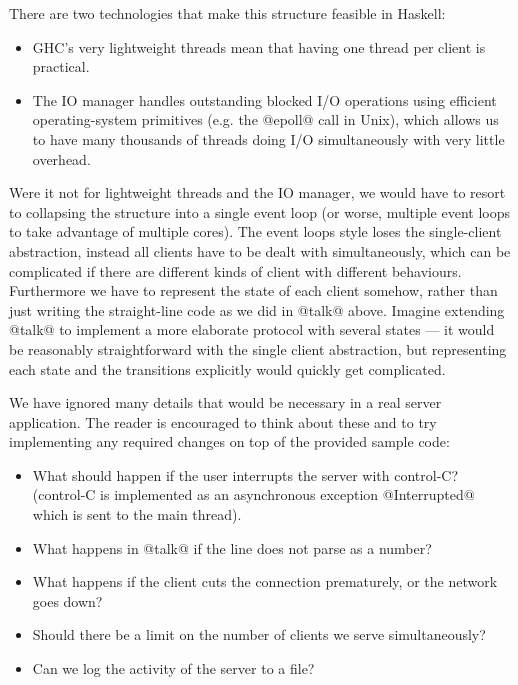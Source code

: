 There are two technologies that make this structure feasible in
Haskell:

\begin{itemize}
\item GHC's very lightweight threads mean that having one thread per
  client is practical.
\item The IO manager \cite{io-manager} handles outstanding blocked I/O
  operations using efficient operating-system primitives (e.g. the
  @epoll@ call in Unix), which allows us to have many thousands of
  threads doing I/O simultaneously with very little overhead.
\end{itemize}

Were it not for lightweight threads and the IO manager, we would have
to resort to collapsing the structure into a single event loop (or
worse, multiple event loops to take advantage of multiple cores).  The
event loops style loses the single-client abstraction, instead all
clients have to be dealt with simultaneously, which can be complicated
if there are different kinds of client with different behaviours.
Furthermore we have to represent the state of each client somehow,
rather than just writing the straight-line code as we did in @talk@
above.  Imagine extending @talk@ to implement a more elaborate
protocol with several states --- it would be reasonably
straightforward with the single client abstraction, but representing
each state and the transitions explicitly would quickly get
complicated.

We have ignored many details that would be necessary in a real server
application.  The reader is encouraged to think about these and to try
implementing any required changes on top of the provided sample code:

\begin{itemize}
\item What should happen if the user interrupts the server with
  control-C? (control-C is implemented as an asynchronous exception
  @Interrupted@ which is sent to the main thread).
\item What happens in @talk@ if the line does not parse as a number?
\item What happens if the client cuts the connection prematurely, or
  the network goes down?
\item Should there be a limit on the number of clients we serve
  simultaneously?
\item Can we log the activity of the server to a file?
\end{itemize}

